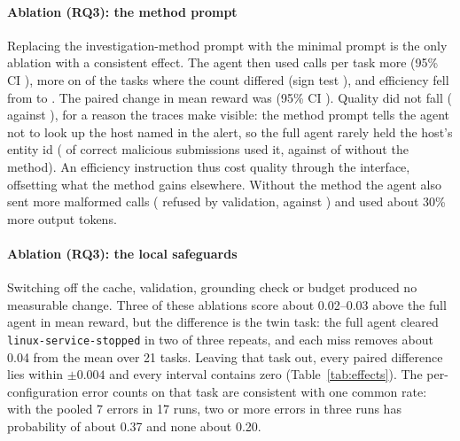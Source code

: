 \ifconf\else

\fi

\paragraph{Ablation (RQ3): the method prompt} Replacing the investigation-method prompt with the minimal prompt
is the only ablation with a consistent effect. The agent then used \ResNoMethodPairedCalls{} calls per task more
(95\% CI \ResNoMethodPairedCallsCI{}), more on \ResNoMethodMoreCalls{} of the \ResNoMethodCallsDiffer{} tasks
where the count differed (sign test \ResNoMethodCallsSignP{}), and efficiency fell from \ResFullEfficiency{} to
\ResNoMethodEfficiency{}. The paired change in mean reward was \ResNoMethodPairedReward{} (95\% CI
\ResNoMethodPairedRewardCI{}).
Quality did not fall (\ResNoMethodQuality{} against \ResFullQuality{}), for a reason the traces make visible:
the method prompt tells the agent not to look up the host named in the alert, so the full agent rarely held the
host's entity id (\TrFullHostById{} of \TrFullMalSubs{} correct malicious submissions used it, against
\TrNoMethodHostById{} of \TrNoMethodMalSubs{} without the method). An efficiency instruction thus cost quality
through the interface, offsetting what the method gains elsewhere. Without the method the agent also sent more
malformed calls (\TrNoMethodValidation{} refused by validation, against \TrFullValidation{}) and used about
30\% more output tokens.

\paragraph{Ablation (RQ3): the local safeguards} Switching off the cache, validation, grounding check or budget
produced no measurable change. Three of these ablations score about 0.02--0.03 above the full agent in mean
reward, but the difference is the twin task: the full agent cleared \texttt{linux-service-stopped} in two of
three repeats, and each miss removes about 0.04 from the mean over 21 tasks. Leaving that task out, every
paired difference lies within $\pm0.004$ and every interval contains zero (Table~\ref{tab:effects}). The
per-configuration error counts on that task are consistent with one common rate: with the pooled 7 errors in 17
runs, two or more errors in three runs has probability of about 0.37 and none about 0.20.

